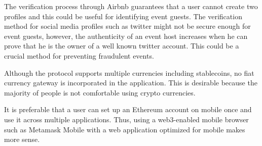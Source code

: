 The verification process through Airbnb guarantees that a user cannot create two profiles and this could be useful for identifying event guests. The verification method for social media profiles such as twitter might not be secure enough for event guests, however, the authenticity of an event host increases when he can prove that he is the owner of a well known twitter account. 
This could be a crucial method for preventing fraudulent events.

Although the protocol supports multiple currencies including stablecoins, no fiat currency gateway is incorporated in the application. This is desirable because the majority of people is not comfortable using crypto currencies.

It is preferable that a user can set up an Ethereum account on mobile once and use it across multiple applications. Thus, using a web3-enabled mobile browser such as Metamask Mobile with a web application optimized for mobile makes more sense.

